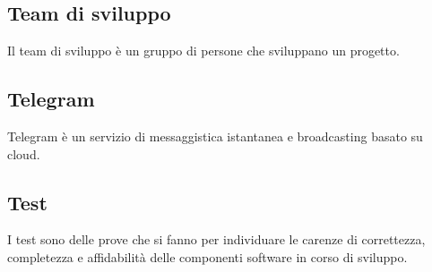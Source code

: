 
\subsection*{Team di sviluppo}
Il team di sviluppo è un gruppo di persone che sviluppano un progetto.

\subsection*{Telegram}
Telegram è un servizio di messaggistica istantanea e broadcasting basato su cloud.

\subsection*{Test}
I test sono delle prove che si fanno per individuare le carenze di correttezza, completezza e affidabilità delle componenti software in corso di sviluppo.

